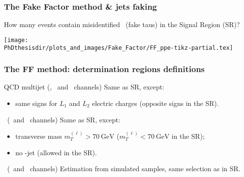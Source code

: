 \begin{frame}
\frametitle{The Fake Factor method \& jets faking \tauh}

\manip How many events contain misidentified \tauh\ (fake taus) in the Signal Region (SR)?


\begin{center}
\texttt{[image: \\PhDthesisdir/plots\_and\_images/Fake\_Factor/FF\_ppe-tikz-partial.tex]}
\end{center}
\end{frame}



\begin{frame}
\frametitle{The FF method: determination regions definitions}

\begin{block}{QCD multijet (\tauh\tauh, \mu\tauh\ and \ele\tauh\ channels)}
Same as SR, except:
\begin{itemize}
\item same signs for $L_1$ and $L_2$ electric charges (opposite signs in the SR).
\end{itemize}
\end{block}

\pause\vfill

\begin{block}{\Wjets\ (\mu\tauh\ and \ele\tauh\ channels)}
Same as SR, except:
\begin{itemize}
\item transverse mass $m_T^{(\ell)}>\SI{70}{\GeV}$ ($m_T^{(\ell)}<\SI{70}{\GeV}$ in the SR);
\item no \quarkb-jet (allowed in the SR).
\end{itemize}
\end{block}

\pause\vfill

\begin{block}{\ttbar\ (\mu\tauh\ and \ele\tauh\ channels)}
Estimation from simulated samples, same selection as in SR.
\end{block}

\vfill
\end{frame}

%
%

